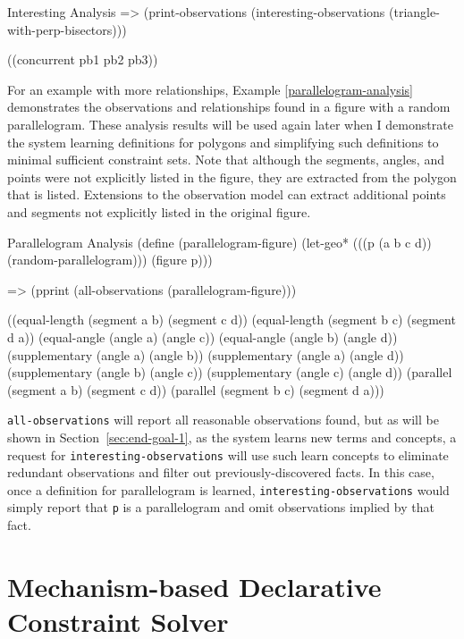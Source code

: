 \begin{repl-example}
[label=interesting-analysis]
{Interesting Analysis}
=> (print-observations (interesting-observations
                         (triangle-with-perp-bisectors)))

((concurrent pb1 pb2 pb3))
\end{repl-example}

For an example with more relationships, Example
\ref{parallelogram-analysis} demonstrates the observations and
relationships found in a figure with a random parallelogram. These
analysis results will be used again later when I demonstrate the
system learning definitions for polygons and simplifying such
definitions to minimal sufficient constraint sets. Note that although
the segments, angles, and points were not explicitly listed in the
figure, they are extracted from the polygon that is listed. Extensions
to the observation model can extract additional points and segments
not explicitly listed in the original figure.

\begin{repl-example}
[label=parallelogram-analysis]
{Parallelogram Analysis}
(define (parallelogram-figure)
  (let-geo* (((p (a b c d)) (random-parallelogram)))
    (figure p)))

=> (pprint (all-observations (parallelogram-figure)))

((equal-length (segment a b) (segment c d))
 (equal-length (segment b c) (segment d a))
 (equal-angle (angle a) (angle c))
 (equal-angle (angle b) (angle d))
 (supplementary (angle a) (angle b))
 (supplementary (angle a) (angle d))
 (supplementary (angle b) (angle c))
 (supplementary (angle c) (angle d))
 (parallel (segment a b) (segment c d))
 (parallel (segment b c) (segment d a)))
\end{repl-example}

\texttt{all-observations} will report all reasonable observations
found, but as will be shown in Section~\ref{sec:end-goal-1}, as the
system learns new terms and concepts, a request for
\texttt{interesting-observations} will use such learn concepts to
eliminate redundant observations and filter out previously-discovered
facts. In this case, once a definition for parallelogram is learned,
\texttt{interesting-observations} would simply report that \texttt{p}
is a parallelogram and omit observations implied by that fact.


\section{Mechanism-based Declarative Constraint Solver}
\label{demo:sec:declarative}

